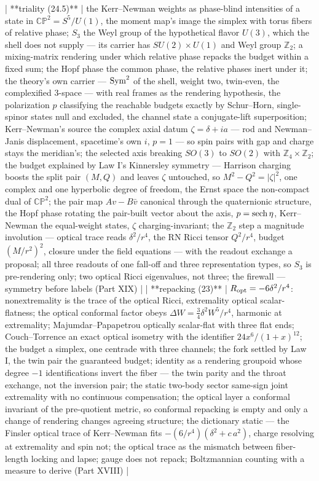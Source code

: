 | **triality (24.5)** | the Kerr–Newman weights as phase-blind intensities of a state in $\mathbb{CP}^2 = S^5/U(1)$, the moment map's image the simplex with torus fibers of relative phase; $S_3$ the Weyl group of the hypothetical flavor $U(3)$, which the shell does not supply — its carrier has $SU(2)\times U(1)$ and Weyl group $\mathbb Z_2$; a mixing-matrix rendering under which relative phase repacks the budget within a fixed sum; the Hopf phase the common phase, the relative phases inert under it; the theory's own carrier — ${\rm Sym}^2$ of the shell, weight two, twin-even, the complexified 3-space — with real frames as the rendering hypothesis, the polarization $p$ classifying the reachable budgets exactly by Schur–Horn, single-spinor states null and excluded, the channel state a conjugate-lift superposition; Kerr–Newman's source the complex axial datum $\zeta = \delta+ia$ — rod and Newman–Janis displacement, spacetime's own $i$, $p = 1$ — so spin pairs with gap and charge stays the meridian's; the selected axis breaking $SO(3)$ to $SO(2)$ with $\mathbb Z_4\times\mathbb Z_2$; the budget explained by Law I's Kinnersley symmetry — Harrison charging boosts the split pair $(M,Q)$ and leaves $\zeta$ untouched, so $M^2-Q^2 = \vert\zeta\vert^2$, one complex and one hyperbolic degree of freedom, the Ernst space the non-compact dual of $\mathbb{CP}^2$; the pair map $Av-B\bar v$ canonical through the quaternionic structure, the Hopf phase rotating the pair-built vector about the axis, $p = {\rm sech}\,\eta$, Kerr–Newman the equal-weight states, $\zeta$ charging-invariant; the $\mathbb Z_2$ step a magnitude involution — optical trace reads $\delta^2/r^4$, the RN Ricci tensor $Q^2/r^4$, budget $(M/r^2)^2$, closure under the field equations — with the readout exchange a proposal; all three readouts of one fall-off and three representation types, so $S_3$ is pre-rendering only; two optical Ricci eigenvalues, not three; the firewall — symmetry before labels (Part XIX) |
| **repacking (23)** | $R_{\rm opt} = -6\delta^2/r^4$: nonextremality is the trace of the optical Ricci, extremality optical scalar-flatness; the optical conformal factor obeys $\Delta W = \tfrac34\delta^2W^5/r^4$, harmonic at extremality; Majumdar–Papapetrou optically scalar-flat with three flat ends; Couch–Torrence an exact optical isometry with the identifier $24x^6/(1+x)^{12}$; the budget a simplex, one centrade with three channels; the fork settled by Law I, the twin pair the guaranteed budget; identity as a rendering groupoid whose degree $-1$ identifications invert the fiber — the twin parity and the throat exchange, not the inversion pair; the static two-body sector same-sign joint extremality with no continuous compensation; the optical layer a conformal invariant of the pre-quotient metric, so conformal repacking is empty and only a change of rendering changes agreeing structure; the dictionary static — the Finsler optical trace of Kerr–Newman fits $-(6/r^4)(\delta^2+c\,a^2)$, charge resolving at extremality and spin not; the optical trace as the mismatch between fiber-length locking and lapse; gauge does not repack; Boltzmannian counting with a measure to derive (Part XVIII) |
